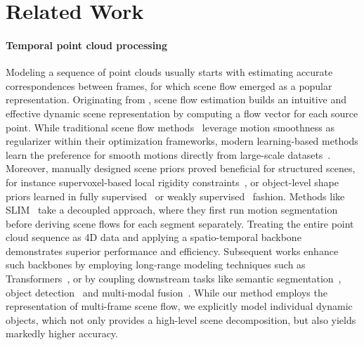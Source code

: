 \section{Related Work}
\label{sec:related}

\paragraph{Temporal point cloud processing}
Modeling a sequence of point clouds usually starts with estimating accurate correspondences between frames, for which scene flow emerged as a popular representation. Originating from \cite{vedula1999three}, scene flow estimation builds an intuitive and effective dynamic scene representation by computing a flow vector for each source point. While traditional scene flow methods~\cite{wedel2008efficient,vogel20113d,vogel2013piecewise,vogel20153d} leverage motion smoothness as regularizer within their optimization frameworks, modern learning-based methods learn the preference for smooth motions directly from large-scale datasets~\cite{liu2019flownet3d,wu2019pointpwc,puy2020flot,ouyang2021occlusion}. Moreover, manually designed scene priors proved beneficial for structured scenes, for instance supervoxel-based local rigidity constraints~\cite{li2021hcrf}, or object-level shape priors learned in fully supervised~\cite{behl2019pointflownet} or weakly supervised~\cite{gojcic2021weakly} fashion.
Methods like SLIM~\cite{baur2021slim} take a decoupled approach, where they first run motion segmentation before deriving scene flows for each segment separately.
Treating the entire point cloud sequence as 4D data and applying a spatio-temporal backbone~\cite{liu2019meteornet,choy2019Minkowski,fan2020pstnet} demonstrates superior performance and efficiency. Subsequent works enhance such backbones by employing long-range modeling techniques such as Transformers~\cite{vaswani2017attention,fan2021point,yang20213d}, or by coupling downstream tasks like semantic segmentation~\cite{aygun20214d}, object detection~\cite{yang2021auto4d,qi2021offboard} and multi-modal fusion~\cite{piergiovanni20214d}.
While our method employs the representation of multi-frame scene flow, we explicitly model individual dynamic objects, which not only provides a high-level scene decomposition, but also yields markedly higher accuracy.

